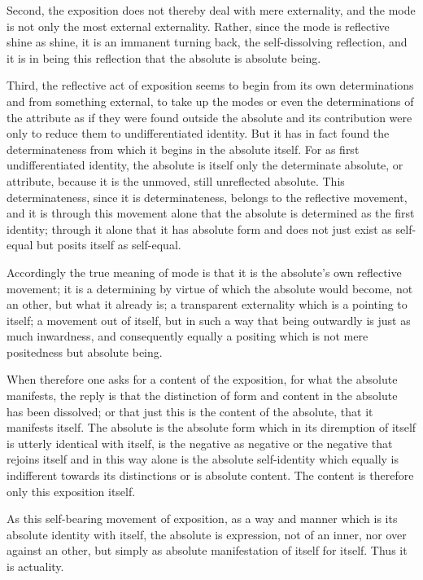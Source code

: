 Second, the exposition does not thereby deal with mere externality,
and the mode is not only the most external externality.
Rather, since the mode is reflective shine as shine,
it is an immanent turning back, the self-dissolving reflection,
and it is in being this reflection that the absolute is absolute being.

Third, the reflective act of exposition seems to begin
from its own determinations and from something external,
to take up the modes or even the determinations of the attribute
as if they were found outside the absolute
and its contribution were only to reduce them
to undifferentiated identity.
But it has in fact found the determinateness
from which it begins in the absolute itself.
For as first undifferentiated identity,
the absolute is itself only the determinate absolute,
or attribute, because it is the unmoved, still unreflected absolute.
This determinateness, since it is determinateness,
belongs to the reflective movement,
and it is through this movement alone
that the absolute is determined as the first identity;
through it alone that it has absolute form
and does not just exist as self-equal
but posits itself as self-equal.

Accordingly the true meaning of mode is that
it is the absolute's own reflective movement;
it is a determining by virtue of which
the absolute would become, not an other, but what it already is;
a transparent externality which is a pointing to itself;
a movement out of itself,
but in such a way that being outwardly is
just as much inwardness,
and consequently equally a positing
which is not mere positedness
but absolute being.

When therefore one asks for a content of the exposition,
for what the absolute manifests,
the reply is that the distinction of form and content
in the absolute has been dissolved;
or that just this is the content of the absolute,
that it manifests itself.
The absolute is the absolute form
which in its diremption of itself is
utterly identical with itself,
is the negative as negative
or the negative that rejoins itself
and in this way alone is the absolute self-identity
which equally is indifferent towards its distinctions
or is absolute content.
The content is therefore only this exposition itself.

As this self-bearing movement of exposition,
as a way and manner which is its absolute identity with itself,
the absolute is expression, not of an inner, nor over against an other,
but simply as absolute manifestation of itself for itself.
Thus it is actuality.

